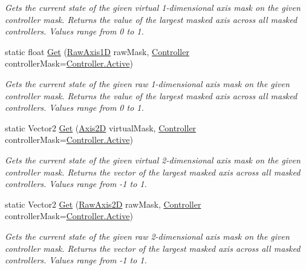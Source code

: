 \begin{DoxyCompactItemize}
\begin{DoxyCompactList}\small\item\em Gets the current state of the given virtual 1-\/dimensional axis mask on the given controller mask. Returns the value of the largest masked axis across all masked controllers. Values range from 0 to 1. \end{DoxyCompactList}\item 
static float \mbox{\hyperlink{class_o_v_r_input_ace9bc5cb3f2817fffc28d58564890133}{Get}} (\mbox{\hyperlink{class_o_v_r_input_a9c9eff2910ca07d1fb0e924273ebefaf}{Raw\+Axis1D}} raw\+Mask, \mbox{\hyperlink{class_o_v_r_input_a5c86f9052a9cbb0b73779ff5704d60a8}{Controller}} controller\+Mask=\mbox{\hyperlink{class_o_v_r_input_a5c86f9052a9cbb0b73779ff5704d60a8a4d3d769b812b6faa6b76e1a8abaece2d}{Controller.\+Active}})
\begin{DoxyCompactList}\small\item\em Gets the current state of the given raw 1-\/dimensional axis mask on the given controller mask. Returns the value of the largest masked axis across all masked controllers. Values range from 0 to 1. \end{DoxyCompactList}\item 
static Vector2 \mbox{\hyperlink{class_o_v_r_input_a9f50a4960aff3d92d98d3661d0321fd8}{Get}} (\mbox{\hyperlink{class_o_v_r_input_a8d8de8321e36e4c5c3b5266b72468d8a}{Axis2D}} virtual\+Mask, \mbox{\hyperlink{class_o_v_r_input_a5c86f9052a9cbb0b73779ff5704d60a8}{Controller}} controller\+Mask=\mbox{\hyperlink{class_o_v_r_input_a5c86f9052a9cbb0b73779ff5704d60a8a4d3d769b812b6faa6b76e1a8abaece2d}{Controller.\+Active}})
\begin{DoxyCompactList}\small\item\em Gets the current state of the given virtual 2-\/dimensional axis mask on the given controller mask. Returns the vector of the largest masked axis across all masked controllers. Values range from -\/1 to 1. \end{DoxyCompactList}\item 
static Vector2 \mbox{\hyperlink{class_o_v_r_input_affa601653694045986dd68f3edd21b6b}{Get}} (\mbox{\hyperlink{class_o_v_r_input_a973c161bfb3bd6d0cc16c3a0b56c9f4a}{Raw\+Axis2D}} raw\+Mask, \mbox{\hyperlink{class_o_v_r_input_a5c86f9052a9cbb0b73779ff5704d60a8}{Controller}} controller\+Mask=\mbox{\hyperlink{class_o_v_r_input_a5c86f9052a9cbb0b73779ff5704d60a8a4d3d769b812b6faa6b76e1a8abaece2d}{Controller.\+Active}})
\begin{DoxyCompactList}\small\item\em Gets the current state of the given raw 2-\/dimensional axis mask on the given controller mask. Returns the vector of the largest masked axis across all masked controllers. Values range from -\/1 to 1. \end{DoxyCompactList}\item 

\end{DoxyCompactItemize}
